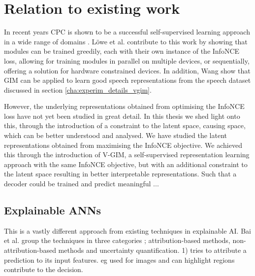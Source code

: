 
\chapter{Relation to existing work}

In recent years CPC is shown to be a successful self-supervised learning approach in a wide range of domains \cite{stackeEvaluationContrastivePredictive2020, dehaanContrastivePredictiveCoding2021, luSemiSupervisedHistologyClassification2019, bhatiSegmentalContrastivePredictive2021b, deldariTimeSeriesChange2021, henaffDataEfficientImageRecognition2020}. Löwe et al. contribute to this work by showing that modules can be trained greedily, each with their own instance of the InfoNCE loss, allowing for training modules in parallel on multiple devices, or sequentially, offering a solution for hardware constrained devices. In addition, Wang \cite{meihanwangSpeechRepresentationLearning2019} show that GIM can be applied to learn good speech representations from the speech dataset discussed in section \ref{cha:experim_details_vgim}.

However, the underlying representations obtained from optimising the InfoNCE loss have not yet been studied in great detail. In this thesis we shed light onto this, through the introduction of a constraint to the latent space, causing space, which can be better understood and analysed. 
	We have studied the latent representations obtained from maximising the InfoNCE objective. 
	We achieved this through the introduction of V-GIM, a self-supervised representation learning approach with the same InfoNCE objective, but with an additional constraint to the latent space resulting in better interpretable representations. Such that a decoder could be trained and predict meaningful ...
	
\section{Explainable ANNs}
	This is a vastly different approach from existing techniques in explainable AI. Bai et al. group the techniques in three categories \cite{baiExplainableDeepLearning2021}; attribution-based methods, non-attribution-based methods and uncertainty quantification.
	1) tries to attribute a prediction to its input features. eg used for images and can highlight regions contribute to the decision.
	
